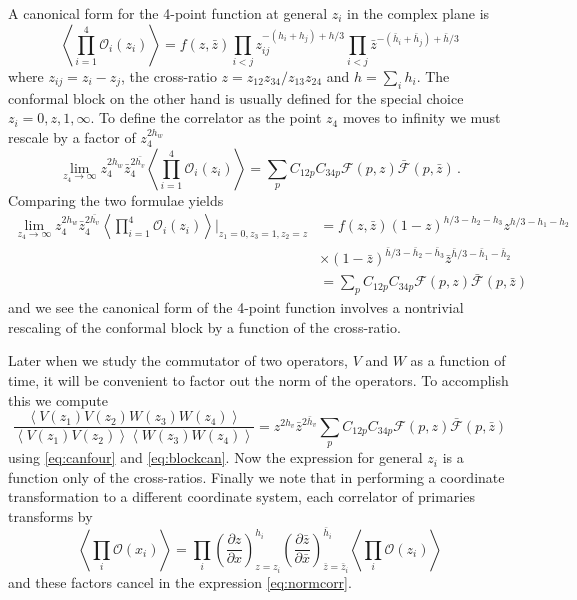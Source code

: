 \documentclass{brownthesis}
\begin{document}
A canonical form for the 4-point function at general $z_{i}$ in the
complex plane is \cite{Ginsparg:1988ui}
\begin{equation}
\left\langle \prod_{i=1}^{4}\mathcal{O}_{i}(z_{i})\right\rangle =f(z,\bar{z})\prod_{i<j}z_{ij}^{-(h_{i}+h_{j})+h/3}\prod_{i<j}\bar{z}^{-(\bar{h}_{i}+\bar{h}_{j})+\bar{h}/3}\label{eq:canfour}
\end{equation}
where $z_{ij}=z_{i}-z_{j}$, the cross-ratio $z=z_{12}z_{34}/z_{13}z_{24}$
and $h=\sum_{i}h_{i}$. The conformal block on the other hand is usually
defined \cite{Belavin:1984vu} for the special choice $z_{i}=0,z,1,\infty$.
To define the correlator as the point $z_{4}$ moves to infinity we
must rescale by a factor of $z_{4}^{2h_{w}}$
\begin{equation}
\lim_{z_{4}\to\infty}z_{4}^{2h_{w}}\bar{z}_{4}^{2\bar{h_{v}}}\left\langle \prod_{i=1}^{4}\mathcal{O}_{i}(z_{i})\right\rangle =\sum_{p}C_{12p}C_{34p}\mathcal{F}(p,z)\bar{\mathcal{F}}(p,\bar{z})\,.\label{eq:blockdef}
\end{equation}
Comparing the two formulae yields
\begin{align}
\lim_{z_{4}\to\infty}z_{4}^{2h_{w}}\bar{z}_{4}^{2\bar{h_{v}}}\left\langle \prod_{i=1}^{4}\mathcal{O}_{i}(z_{i})\right\rangle \bigg|_{z_{1}=0,z_{3}=1,z_{2}=z} & =f(z,\bar{z})\left(1-z\right)^{h/3-h_{2}-h_{3}}z^{h/3-h_{1}-h_{2}}\nonumber \\
 & \times\left(1-\bar{z}\right)^{\bar{h}/3-\bar{h}_{2}-\bar{h}_{3}}\bar{z}^{\bar{h}/3-\bar{h}_{1}-\bar{h}_{2}}\nonumber \\
 & =\sum_{p}C_{12p}C_{34p}\mathcal{F}(p,z)\bar{\mathcal{F}}(p,\bar{z})\label{eq:blockcan}
\end{align}
and we see the canonical form of the 4-point function involves a nontrivial
rescaling of the conformal block by a function of the cross-ratio.

Later when we study the commutator of two operators, $V$ and $W$
as a function of time, it will be convenient to factor out the norm
of the operators. To accomplish this we compute
\begin{equation}
\frac{\left\langle V(z_{1})V(z_{2})W(z_{3})W(z_{4})\right\rangle }{\left\langle V(z_{1})V(z_{2})\right\rangle \left\langle W(z_{3})W(z_{4})\right\rangle }=z^{2h_{v}}\bar{z}^{2\bar{h}_{v}}\sum_{p}C_{12p}C_{34p}\mathcal{F}(p,z)\bar{\mathcal{F}}(p,\bar{z})\label{eq:normcorr}
\end{equation}
using \eqref{eq:canfour} and \eqref{eq:blockcan}. Now the expression
for general $z_{i}$  is a function only of the cross-ratios. Finally
we note that in performing a coordinate transformation to a different
coordinate system, each correlator of primaries transforms by
\[
\left\langle \prod_{i}\mathcal{O}(x_{i})\right\rangle =\prod_{i}\left(\frac{\partial z}{\partial x}\right)_{z=z_{i}}^{h_{i}}\left(\frac{\partial\bar{z}}{\partial\bar{x}}\right)_{\bar{z}=\bar{z}_{i}}^{\bar{h}_{i}}\left\langle \prod_{i}\mathcal{O}(z_{i})\right\rangle
\]
and these factors cancel in the expression \eqref{eq:normcorr}.
\end{document}
